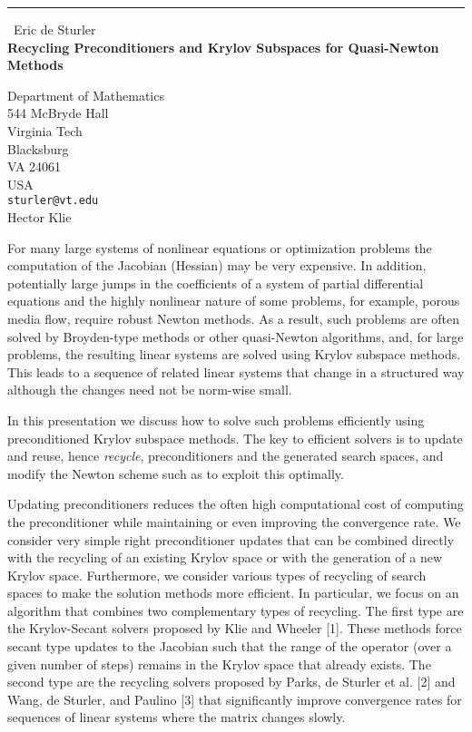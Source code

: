 \documentclass{report}
\begin{document}
\begin{center}
\rule{6in}{1pt} \
{\large Eric de Sturler \\
{\bf Recycling Preconditioners and Krylov Subspaces for Quasi-Newton Methods}}

Department of Mathematics \\ 544 McBryde Hall \\ Virginia Tech \\ Blacksburg \\ VA 24061 \\ USA
\\
{\tt sturler@vt.edu}\\
Hector Klie\end{center}

For many large systems of nonlinear equations or optimization problems
the computation of the Jacobian (Hessian) may be very expensive. In
addition, potentially large jumps in the coefficients of a system of
partial differential equations and the highly nonlinear nature of some
problems, for example, porous media flow, require robust Newton methods.
As a result, such problems are often solved by Broyden-type methods or
other quasi-Newton algorithms, and, for large problems, the resulting
linear systems are solved using Krylov subspace methods. This leads to a
sequence of related linear systems that change in a structured way
although the changes need not be norm-wise small.

In this presentation we discuss how to solve such problems efficiently
using preconditioned Krylov subspace methods. The key to efficient
solvers is to update and reuse, hence {\em recycle}, preconditioners and
the generated search spaces, and modify the Newton scheme such as to
exploit this optimally.

Updating preconditioners reduces the often high computational cost of
computing the preconditioner while maintaining or even improving the
convergence rate.
We consider very simple right preconditioner updates that can be combined
directly with the recycling of an existing Krylov space or with the
generation of a new Krylov space. Furthermore, we consider various types
of recycling of search spaces to make the solution methods more
efficient. In particular, we focus on an algorithm that combines two
complementary types of recycling. The first type are the Krylov-Secant
solvers proposed by Klie and Wheeler [1]. These methods force secant type
updates to the
Jacobian such that the range of the operator (over a given number of
steps) remains in the Krylov space that already exists. The second type
are the recycling solvers proposed by Parks, de Sturler et al. [2] and
Wang, de Sturler, and Paulino [3] that significantly improve convergence
rates for sequences of linear systems where the matrix changes slowly.
\end{document}
